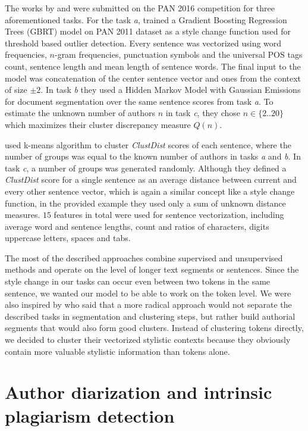 \documentclass[10pt, a4paper]{article}
\begin{document}
The works by \citet{kuznetsov-2016} and \citet{sittar-2016} were submitted on the PAN 2016 competition for three aforementioned tasks. For the task \emph{a}, \citet{kuznetsov-2016} trained a Gradient Boosting Regression Trees (GBRT) model on PAN 2011 dataset as a style change function used for threshold based outlier detection. Every sentence was vectorized using word frequencies, $n$-gram frequencies, punctuation symbols and the universal POS tags count, sentence length and mean length of sentence words. The final input to the model was concatenation of the center sentence vector and ones from the context of size $\pm2$. In task \emph{b} they used a Hidden Markov Model with Gaussian Emissions for document segmentation over the same sentence scores from task \emph{a}. To estimate the unknown number of authors $n$ in task \emph{c}, they chose $n\in\{2..20\}$ which maximizes their cluster discrepancy measure $Q(n)$.

\citet{sittar-2016} used k-means algorithm to cluster \textit{ClustDist} scores of each sentence, where the number of groups was equal to the known number of authors in tasks \emph{a} and \emph{b}. In task \emph{c}, a number of groups was generated randomly. Although they defined a \emph{ClustDist} score for a single sentence as an average distance between current and every other sentence vector, which is again a similar concept like a style change function, in the provided example they used only a sum of unknown distance measures. $15$ features in total were used for sentence vectorization, including average word and sentence lengths, count and ratios of characters, digits uppercase letters, spaces and tabs. 

The most of the described approaches combine supervised and unsupervised methods and operate on the level of longer text segments or sentences. Since the style change in our tasks can occur even between two tokens in the same sentence, we wanted our model to be able to work on the token level. We were also inspired by \citet{brooke-2013} who said that a more radical approach would not separate the described tasks in segmentation and clustering steps, but rather build authorial segments that would also form good clusters. Instead of clustering tokens directly, we decided to cluster their vectorized stylistic contexts because they obviously contain more valuable stylistic information than tokens alone.

\section{Author diarization and intrinsic plagiarism detection} \label{sec:author-diraization}
\end{document}
